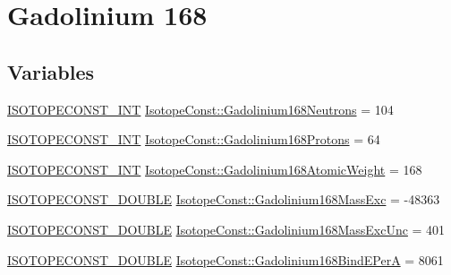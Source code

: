 \hypertarget{group___isotope_const-_gadolinium-_gd168}{}\section{Gadolinium 168}
\label{group___isotope_const-_gadolinium-_gd168}
\subsection*{Variables}
\begin{DoxyCompactItemize}
\item 
\mbox{\hyperlink{group___isotope_const-_macros_ga5f18360b3e99483a35c32d789e62621c}{I\+S\+O\+T\+O\+P\+E\+C\+O\+N\+S\+T\+\_\+\+I\+NT}} \mbox{\hyperlink{group___isotope_const-_gadolinium-_gd168_ga9f67b476d384b4baa3398cb4aadd8dee}{Isotope\+Const\+::\+Gadolinium168\+Neutrons}} = 104
\item 
\mbox{\hyperlink{group___isotope_const-_macros_ga5f18360b3e99483a35c32d789e62621c}{I\+S\+O\+T\+O\+P\+E\+C\+O\+N\+S\+T\+\_\+\+I\+NT}} \mbox{\hyperlink{group___isotope_const-_gadolinium-_gd168_ga0e74b89b7720b1d06738f972f8d3cf7a}{Isotope\+Const\+::\+Gadolinium168\+Protons}} = 64
\item 
\mbox{\hyperlink{group___isotope_const-_macros_ga5f18360b3e99483a35c32d789e62621c}{I\+S\+O\+T\+O\+P\+E\+C\+O\+N\+S\+T\+\_\+\+I\+NT}} \mbox{\hyperlink{group___isotope_const-_gadolinium-_gd168_ga4c5ace7202baaad3aad48ca8505395f2}{Isotope\+Const\+::\+Gadolinium168\+Atomic\+Weight}} = 168
\item 
\mbox{\hyperlink{group___isotope_const-_macros_ga8f45a7272ce02c0b4c65c44636ed719a}{I\+S\+O\+T\+O\+P\+E\+C\+O\+N\+S\+T\+\_\+\+D\+O\+U\+B\+LE}} \mbox{\hyperlink{group___isotope_const-_gadolinium-_gd168_ga9670a9bccdcf30813c069f7c4593708f}{Isotope\+Const\+::\+Gadolinium168\+Mass\+Exc}} = -\/48363
\item 
\mbox{\hyperlink{group___isotope_const-_macros_ga8f45a7272ce02c0b4c65c44636ed719a}{I\+S\+O\+T\+O\+P\+E\+C\+O\+N\+S\+T\+\_\+\+D\+O\+U\+B\+LE}} \mbox{\hyperlink{group___isotope_const-_gadolinium-_gd168_ga4d007e40e82e050012799a2efdf46c3d}{Isotope\+Const\+::\+Gadolinium168\+Mass\+Exc\+Unc}} = 401
\item 
\mbox{\hyperlink{group___isotope_const-_macros_ga8f45a7272ce02c0b4c65c44636ed719a}{I\+S\+O\+T\+O\+P\+E\+C\+O\+N\+S\+T\+\_\+\+D\+O\+U\+B\+LE}} \mbox{\hyperlink{group___isotope_const-_gadolinium-_gd168_gacbcf02c167c53ab4edf6e25e03b4d318}{Isotope\+Const\+::\+Gadolinium168\+Bind\+E\+PerA}} = 8061
\item 

\end{DoxyCompactItemize}
